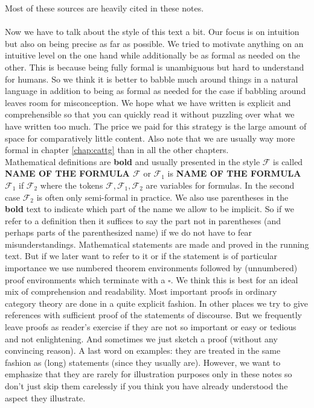 Most of these sources are heavily cited in these notes.
\\\\
Now we have to talk about the style of this text a bit. Our focus is on intuition but also on being precise as far as possible. We tried to motivate anything on an intuitive level on the one hand while additionally be as formal as needed on the other. This is because being fully formal is unambiguous but hard to understand for humans. So we think it is better to babble much around things in a natural language in addition to being as formal as needed for the case if babbling around leaves room for misconception. We hope what we have written is explicit and comprehensible so that you can quickly read it without puzzling over what we have written too much. The price we paid for this strategy is the large amount of space for comparatively little content. Also note that we are usually way more formal in chapter \ref{chap:cattg} than in all the other chapters.
\\
Mathematical definitions are \textbf{bold} and usually presented in the style {\glqq}$\mathcal{F}$ is called \textbf{NAME OF THE FORMULA $\mathcal{F}$}{\grqq} or {\glqq}$\mathcal{F}_{1}$ is \textbf{NAME OF THE FORMULA $\mathcal{F}_{1}$} if $\mathcal{F}_{2}${\grqq} where the tokens $\mathcal{F},\mathcal{F}_{1},\mathcal{F}_{2}$ are variables for formulas. In the second case $\mathcal{F}_{2}$ is often only semi-formal in practice. We also use parentheses in the \textbf{bold} text to indicate which part of the name we allow to be implicit. So if we refer to a definition then it suffices to say the part not in parentheses (and perhaps parts of the parenthesized name) if we do not have to fear misunderstandings. Mathematical statements are made and proved in the running text. But if we later want to refer to it or if the statement is of particular importance we use numbered theorem environments followed by (unnumbered) proof environments which terminate with a $\square$. We think this is best for an ideal mix of comprehension and readability. Most important proofs in ordinary category theory are done in a quite explicit fashion. In other places we try to give references with sufficient proof of the statements of discourse. But we frequently leave proofs as reader's exercise if they are not so important or easy or tedious and not enlightening. And sometimes we just sketch a proof (without any convincing reason). A last word on examples: they are treated in the same fashion as (long) statements (since they usually are). However, we want to emphasize that they are rarely for illustration purposes only in these notes so don't just skip them carelessly if you think you have already understood the aspect they illustrate.
